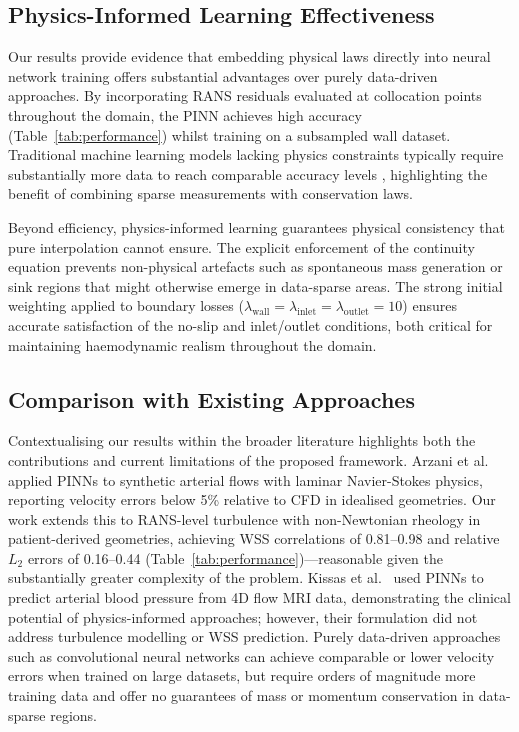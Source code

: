 \documentclass[11pt,a4paper]{article}
\begin{document}
\subsection{Physics-Informed Learning Effectiveness}

Our results provide evidence that embedding physical laws directly into neural network training offers substantial advantages over purely data-driven approaches. By incorporating RANS residuals evaluated at collocation points throughout the domain, the PINN achieves high accuracy (Table~\ref{tab:performance}) whilst training on a subsampled wall dataset. Traditional machine learning models lacking physics constraints typically require substantially more data to reach comparable accuracy levels \cite{ref15}, highlighting the benefit of combining sparse measurements with conservation laws.

Beyond efficiency, physics-informed learning guarantees physical consistency that pure interpolation cannot ensure. The explicit enforcement of the continuity equation prevents non-physical artefacts such as spontaneous mass generation or sink regions that might otherwise emerge in data-sparse areas. The strong initial weighting applied to boundary losses ($\lambda_{\text{wall}} = \lambda_{\text{inlet}} = \lambda_{\text{outlet}} = 10$) ensures accurate satisfaction of the no-slip and inlet/outlet conditions, both critical for maintaining haemodynamic realism throughout the domain.

\subsection{Comparison with Existing Approaches}

Contextualising our results within the broader literature highlights both the contributions and current limitations of the proposed framework. Arzani et al.\ \cite{ref14} applied PINNs to synthetic arterial flows with laminar Navier-Stokes physics, reporting velocity errors below 5\% relative to CFD in idealised geometries. Our work extends this to RANS-level turbulence with non-Newtonian rheology in patient-derived geometries, achieving WSS correlations of 0.81--0.98 and relative $L_2$ errors of 0.16--0.44 (Table~\ref{tab:performance})---reasonable given the substantially greater complexity of the problem. Kissas et al.\ \cite{ref15} used PINNs to predict arterial blood pressure from 4D flow MRI data, demonstrating the clinical potential of physics-informed approaches; however, their formulation did not address turbulence modelling or WSS prediction. Purely data-driven approaches such as convolutional neural networks \cite{ref10} can achieve comparable or lower velocity errors when trained on large datasets, but require orders of magnitude more training data and offer no guarantees of mass or momentum conservation in data-sparse regions.
\end{document}
